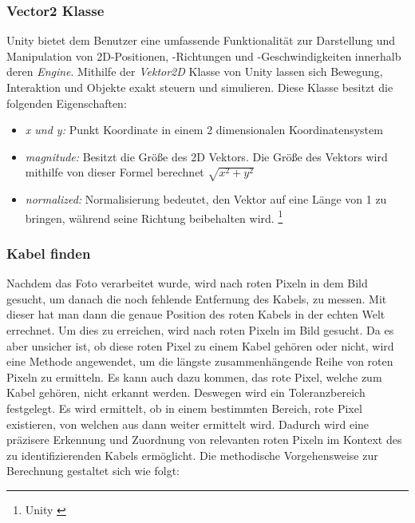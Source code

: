 \subsubsection{\label{sec:Vector2}Vector2 Klasse}
Unity bietet dem Benutzer eine umfassende Funktionalität zur Darstellung und Manipulation von 2D-Positionen, -Richtungen und -Geschwindigkeiten innerhalb deren \textit{Engine}. Mithilfe der \textit{Vektor2D} Klasse von Unity lassen sich Bewegung, Interaktion und Objekte exakt steuern und simulieren. Diese Klasse besitzt die folgenden Eigenschaften:
\begin{itemize}
    \item \textit{x und y: }Punkt Koordinate in einem 2 dimensionalen Koordinatensystem
    \item \textit{magnitude: }Besitzt die Größe des 2D Vektors. Die Größe des Vektors wird mithilfe von dieser Formel berechnet $\sqrt{x^2 + y^2}$
    \item \textit{normalized: }Normalisierung bedeutet, den Vektor auf eine Länge von 1 zu bringen, während seine Richtung beibehalten wird. \protect\footnote{Unity \cite{Vector2}}
\end{itemize}


\subsubsection{Kabel finden}
Nachdem das Foto verarbeitet wurde, wird nach roten Pixeln in dem Bild gesucht, um danach die noch fehlende Entfernung des Kabels, zu messen. Mit dieser hat man dann die genaue Position des roten Kabels in der echten Welt errechnet. Um dies zu erreichen, wird nach roten Pixeln im Bild gesucht. Da es aber unsicher ist, ob diese roten Pixel zu einem Kabel gehören oder nicht, wird eine Methode angewendet, um die längste zusammenhängende Reihe von roten Pixeln zu ermitteln. Es kann auch dazu kommen, das rote Pixel, welche zum Kabel gehören, nicht erkannt werden. Deswegen wird ein Toleranzbereich festgelegt. Es wird ermittelt, ob in einem bestimmten Bereich, rote Pixel existieren, von welchen aus dann weiter ermittelt wird. Dadurch wird eine präzisere Erkennung und Zuordnung von relevanten roten Pixeln im Kontext des zu identifizierenden Kabels ermöglicht. Die methodische Vorgehensweise zur Berechnung gestaltet sich wie folgt:

